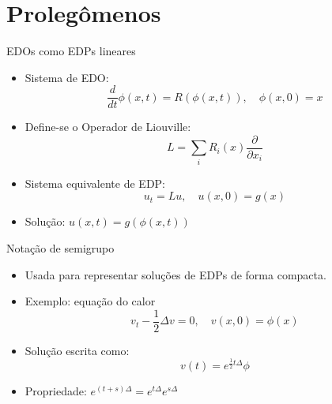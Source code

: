 \section{Prolegômenos}

\begin{frame}{EDOs como EDPs lineares}
\begin{itemize}
    \item Sistema de EDO:
    \begin{equation*}
        \frac{d}{dt} \phi(x,t) = R(\phi(x,t)), \quad \phi(x,0) = x
    \end{equation*}
    \item Define-se o Operador de Liouville:
    \begin{equation*}
        L = \sum_i R_i(x) \frac{\partial}{\partial x_i}
    \end{equation*}
    \item Sistema equivalente de EDP:
    \begin{equation*}
        u_t = Lu, \quad u(x,0) = g(x)
    \end{equation*}
    \item Solução: $u(x,t) = g(\phi(x,t))$
\end{itemize}
\end{frame}

\begin{frame}{Notação de semigrupo}
\begin{itemize}
    \item Usada para representar soluções de EDPs de forma compacta.
    \item Exemplo: equação do calor
    \begin{equation*}
        v_t - \frac{1}{2}\Delta v = 0, \quad v(x,0) = \phi(x)
    \end{equation*}
    \item Solução escrita como:
    \begin{equation*}
        v(t) = e^{\frac{1}{2}t\Delta} \phi
    \end{equation*}
    \item Propriedade: $e^{(t+s)\Delta} = e^{t\Delta} e^{s\Delta}$
\end{itemize}
\end{frame}

